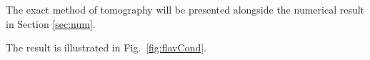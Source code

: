 \documentclass[two column]{article}
\begin{document}
The exact method of tomography will be presented alongside the numerical result in Section \ref{sec:num}. 



The result is illustrated in Fig.~\ref{fig:flavCond}.








%
\end{document}
